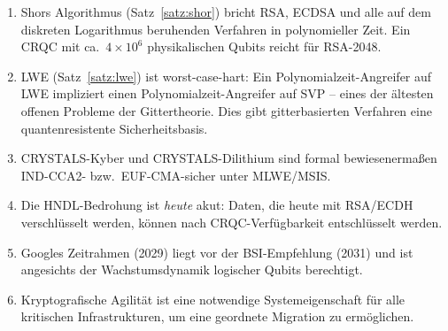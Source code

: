 ﻿\documentclass[a4paper,12pt]{article}
\theoremstyle{definition}
\begin{document}
\begin{enumerate}
\item Shors Algorithmus (Satz~\ref{satz:shor}) bricht RSA, ECDSA und alle
  auf dem diskreten Logarithmus beruhenden Verfahren in polynomieller Zeit.
  Ein CRQC mit ca.\ $4 \times 10^6$ physikalischen Qubits reicht für RSA-2048.

\item LWE (Satz~\ref{satz:lwe}) ist worst-case-hart: Ein Polynomialzeit-Angreifer
  auf LWE impliziert einen Polynomialzeit-Angreifer auf SVP -- eines der ältesten
  offenen Probleme der Gittertheorie. Dies gibt gitterbasierten Verfahren
  eine quantenresistente Sicherheitsbasis.

\item CRYSTALS-Kyber und CRYSTALS-Dilithium sind formal bewiesenermaßen
  IND-CCA2- bzw.\ EUF-CMA-sicher unter MLWE/MSIS.

\item Die HNDL-Bedrohung ist \emph{heute} akut: Daten, die heute mit RSA/ECDH
  verschlüsselt werden, können nach CRQC-Verfügbarkeit entschlüsselt werden.

\item Googles Zeitrahmen (2029) liegt vor der BSI-Empfehlung (2031) und
  ist angesichts der Wachstumsdynamik logischer Qubits berechtigt.

\item Kryptografische Agilität ist eine notwendige Systemeigenschaft für
  alle kritischen Infrastrukturen, um eine geordnete Migration zu ermöglichen.
\end{enumerate}
\end{document}
